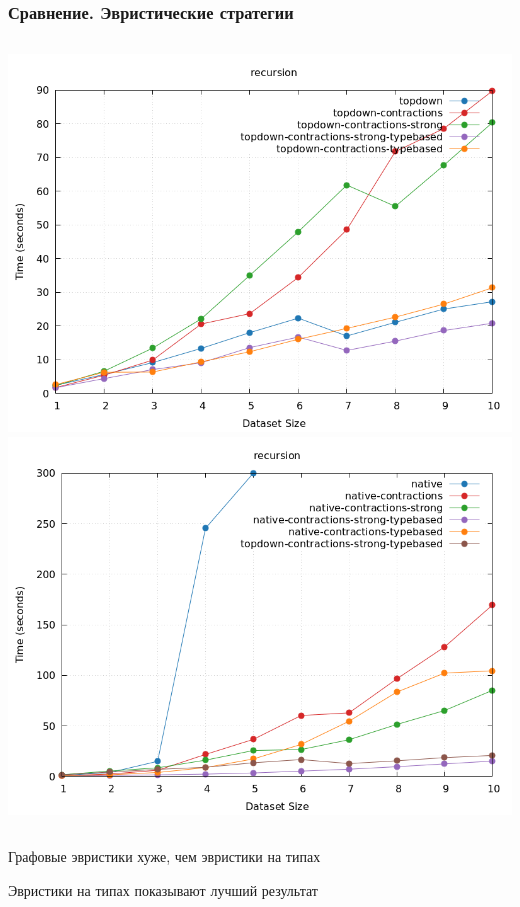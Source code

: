 \documentclass{beamer}
\begin{document}
\begin{frame}\frametitle{Сравнение. Эвристические стратегии}
  \begin{columns}
    \includegraphics[width=\textwidth]{topdown.png}
    \includegraphics[width=\textwidth]{native.png}
  \end{columns}

  \bigskip
  \centering

  Графовые эвристики хуже, чем эвристики на типах
  \bigskip

  Эвристики на типах показывают лучший результат
\end{frame}
\end{document}
